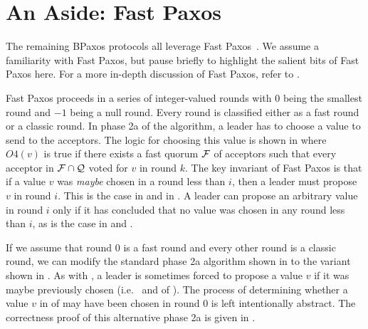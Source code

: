\section{An Aside: Fast Paxos}


The remaining BPaxos protocols all leverage Fast Paxos~\cite{lamport2006fast}.
We assume a familiarity with Fast Paxos, but pause briefly to highlight the
salient bits of Fast Paxos here. For a more in-depth discussion of Fast Paxos,
refer to .

Fast Paxos proceeds in a series of integer-valued rounds with $0$ being the
smallest round and $-1$ being a null round. Every round is classified either as
a fast round or a classic round. In phase 2a of the algorithm, a leader has to
choose a value to send to the acceptors. The logic for choosing this value is
shown in  where $O4(v)$ is true if there exists a fast
quorum $\mathcal{F}$ of acceptors such that every acceptor in $\mathcal{F} \cap
\mathcal{Q}$ voted for $v$ in round $k$.
%
The key invariant of Fast Paxos is that if a value $v$ was \emph{maybe} chosen
in a round less than $i$, then a leader must propose $v$ in round $i$. This is
the case in  and  in
. A leader can propose an arbitrary value in round $i$ only
if it has concluded that no value was chosen in any round less than $i$, as is
the case in  and .

If we assume that round $0$ is a fast round and every other round is a classic
round, we can modify the standard phase 2a algorithm shown in
 to the variant shown in . As with
, a leader is sometimes forced to propose a value $v$ if it
was maybe previously chosen (i.e.\  and
 of ). The process of
determining whether a value $v$ in  of
 may have been chosen in round $0$ is left
intentionally abstract. The correctness proof of this alternative phase 2a is
given in .
